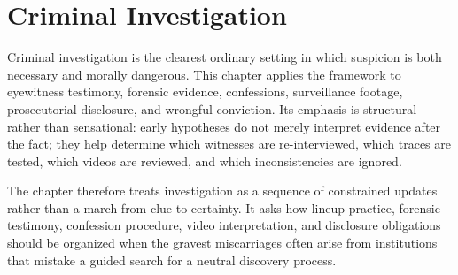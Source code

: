 
\chapter{Criminal Investigation}
\label{ch:ch083}

Criminal investigation is the clearest ordinary setting in which suspicion is both necessary and morally dangerous. This chapter applies the framework to eyewitness testimony, forensic evidence, confessions, surveillance footage, prosecutorial disclosure, and wrongful conviction. Its emphasis is structural rather than sensational: early hypotheses do not merely interpret evidence after the fact; they help determine which witnesses are re-interviewed, which traces are tested, which videos are reviewed, and which inconsistencies are ignored.

The chapter therefore treats investigation as a sequence of constrained updates rather than a march from clue to certainty. It asks how lineup practice, forensic testimony, confession procedure, video interpretation, and disclosure obligations should be organized when the gravest miscarriages often arise from institutions that mistake a guided search for a neutral discovery process.
